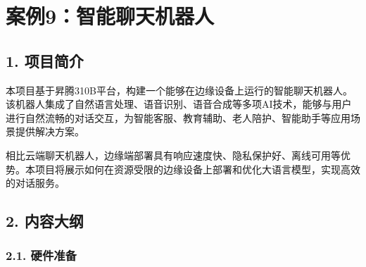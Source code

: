 \chapter{案例9：智能聊天机器人}\label{ux6848ux4f8b9ux667aux80fdux804aux5929ux673aux5668ux4eba}

\section{1. 项目简介}\label{ux9879ux76eeux7b80ux4ecb}

本项目基于昇腾310B平台，构建一个能够在边缘设备上运行的智能聊天机器人。该机器人集成了自然语言处理、语音识别、语音合成等多项AI技术，能够与用户进行自然流畅的对话交互，为智能客服、教育辅助、老人陪护、智能助手等应用场景提供解决方案。

相比云端聊天机器人，边缘端部署具有响应速度快、隐私保护好、离线可用等优势。本项目将展示如何在资源受限的边缘设备上部署和优化大语言模型，实现高效的对话服务。

\section{2. 内容大纲}\label{ux5185ux5bb9ux5927ux7eb2}

\subsection{2.1. 硬件准备}\label{ux786cux4ef6ux51c6ux5907}

